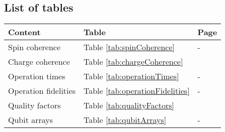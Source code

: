\documentclass[aps, prx, showpacs, twocolumn, superscriptaddress, notitlepage, longbibliography, floatfix, nofootinbib]{revtex4-2}
\newif\ifFirstTableOnly
\begin{document}
\begin{widetext}



\section{List of tables}

\label{app:tables}

\vspace{3cm}

\begin{table}[h!]
\Large
\begin{center}
\begin{tabular}{l@{\quad}ll}
\toprule
Content & Table & Page\\
\midrule
Spin coherence & Table \ref{tab:spinCoherence} & \pageref{spinCoherence1}-\pageref{spinCoherence4}\\
Charge coherence & Table \ref{tab:chargeCoherence} & \pageref{chargeCoherence}\\
Operation times & Table \ref{tab:operationTimes} & \pageref{operationTime1}-\pageref{operationTime2}\\
Operation fidelities & Table \ref{tab:operationFidelities} & \pageref{operationFidelity1}-\pageref{operationFidelity2}\\
Quality factors & Table \ref{tab:qualityFactors} & \pageref{qualityFactor}\\
Qubit arrays & Table \ref{tab:qubitArrays} & \pageref{qubitArray1}-\pageref{qubitArray2}\\
\bottomrule
\end{tabular}
\end{center}
\end{table}

\vspace{3cm}





\addtocounter{table}{-1}\label{tab:spinCoherence}
\renewcommand\thetable{\Roman{table}-\arabic{subtable}}
\setcounter{subtable}{1}


\addtocounter{table}{-1}
\addtocounter{subtable}{+1}

\ifFirstTableOnly \else

\addtocounter{table}{-1}
\addtocounter{subtable}{+1}


\addtocounter{table}{-1}
\addtocounter{subtable}{+1}


\end{widetext}
\end{document}
